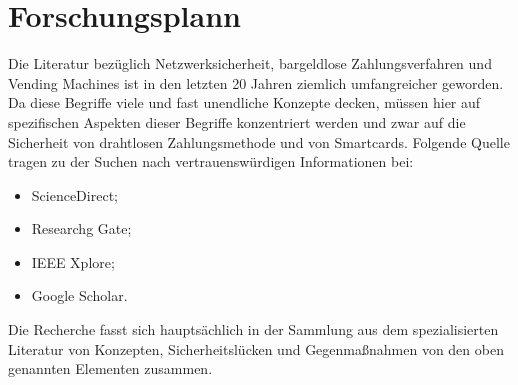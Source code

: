 \section{Forschungsplann}

Die Literatur bezüglich Netzwerksicherheit, bargeldlose Zahlungsverfahren und Vending Machines ist 
in den letzten 20 Jahren ziemlich umfangreicher geworden. Da diese Begriffe viele und fast unendliche 
Konzepte decken, müssen hier auf spezifischen Aspekten dieser Begriffe konzentriert werden und zwar 
auf die Sicherheit von drahtlosen Zahlungsmethode und von Smartcards. Folgende Quelle tragen zu der
Suchen nach vertrauenswürdigen Informationen bei:

\begin{itemize}
    \item ScienceDirect;
    \item Researchg Gate;
    \item IEEE  Xplore;
    \item Google Scholar.
\end{itemize}

Die Recherche fasst sich hauptsächlich in der Sammlung aus dem spezialisierten Literatur von Konzepten,
Sicherheitslücken und Gegenmaßnahmen von den oben genannten Elementen zusammen. 